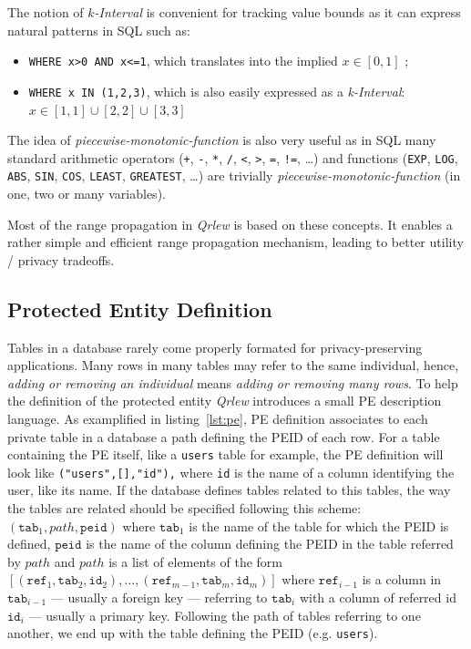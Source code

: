 \documentclass[letterpaper]{article} %
\newcommand{\qrlew}{\emph{Qrlew}}
\begin{document}
The notion of \emph{$k$-Interval} is convenient for tracking value bounds as it can express natural patterns in SQL such as:
\begin{itemize}
    \item \texttt{WHERE x>0 AND x<=1}, which translates into the implied $x\in \left[0, 1\right]$ ;
    \item \texttt{WHERE x IN (1,2,3)}, which is also easily expressed as a \emph{k-Interval}: $x \in \left[1, 1\right] \cup \left[2, 2\right] \cup \left[3, 3\right]$
\end{itemize}

The idea of \emph{piecewise-monotonic-function} is also very useful as in SQL many standard arithmetic operators (\texttt{+}, \texttt{-}, \texttt{*}, \texttt{/}, \texttt{<}, \texttt{>}, \texttt{=}, \texttt{!=}, \ldots) and functions (\texttt{EXP}, \texttt{LOG}, \texttt{ABS}, \texttt{SIN}, \texttt{COS}, \texttt{LEAST}, \texttt{GREATEST}, \ldots) are trivially \emph{piecewise-monotonic-function} (in one, two or many variables).

Most of the range propagation in \qrlew{} is based on these concepts. It enables a rather simple and efficient range propagation mechanism, leading to better utility / privacy tradeoffs.

\subsection{Protected Entity Definition}

Tables in a database rarely come properly formated for privacy-preserving applications. Many rows in many tables may refer to the same individual, hence, \emph{adding or removing an individual} means \emph{adding or removing many rows}. To help the definition of the protected entity \qrlew{} introduces a small PE description language.
As examplified in listing~\ref{lst:pe}, PE definition associates to each private table in a database a path defining the PEID of each row. For a table containing the PE itself, like a \texttt{users} table for example, the PE definition will look like \texttt{("users",[],"id"),} where \texttt{id} is the name of a column identifying the user, like its name. If the database defines tables related to this tables, the way the tables are related should be specified following this scheme: $(\mathtt{tab}_1, path, \mathtt{peid})$ where $\mathtt{tab}_1$ is the name of the table for which the PEID is defined, $\mathtt{peid}$ is the name of the column defining the PEID in the table referred by $path$ and $path$ is a list of elements of the form $[(\mathtt{ref}_1, \mathtt{tab}_2, \mathtt{id}_2),\ldots, (\mathtt{ref}_{m-1}, \mathtt{tab}_m, \mathtt{id}_m)]$
where $\mathtt{ref}_{i-1}$ is a column in $\mathtt{tab}_{i-1}$ --- usually a foreign key --- referring to $\mathtt{tab}_i$ with a column of referred id $\mathtt{id}_i$ --- usually a primary key. Following the path of tables referring to one another, we end up with the table defining the PEID (e.g. \texttt{users}).
\end{document}
